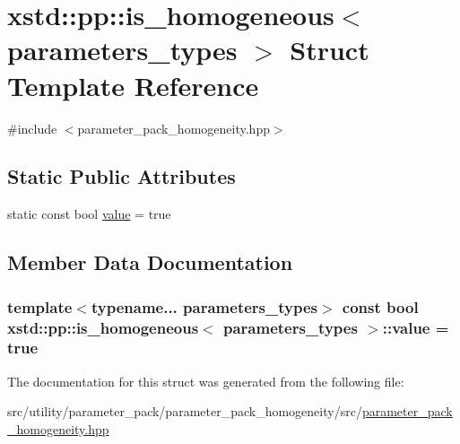 \hypertarget{structxstd_1_1pp_1_1is__homogeneous}{\section{xstd\-:\-:pp\-:\-:is\-\_\-homogeneous$<$ parameters\-\_\-types $>$ Struct Template Reference}
\label{structxstd_1_1pp_1_1is__homogeneous}
}


{\ttfamily \#include $<$parameter\-\_\-pack\-\_\-homogeneity.\-hpp$>$}

\subsection*{Static Public Attributes}
\begin{DoxyCompactItemize}
\item 
static const bool \hyperlink{structxstd_1_1pp_1_1is__homogeneous_a104d1888e8f39e2d57ab27c7c3fb7383}{value} = true
\end{DoxyCompactItemize}


\subsection{Member Data Documentation}
\hypertarget{structxstd_1_1pp_1_1is__homogeneous_a104d1888e8f39e2d57ab27c7c3fb7383}{
\subsubsection[{value}]{\setlength{\rightskip}{0pt plus 5cm}template$<$typename... parameters\-\_\-types$>$ const bool {\bf xstd\-::pp\-::is\-\_\-homogeneous}$<$ parameters\-\_\-types $>$\-::value = true\hspace{0.3cm}{\ttfamily [static]}}}\label{structxstd_1_1pp_1_1is__homogeneous_a104d1888e8f39e2d57ab27c7c3fb7383}


The documentation for this struct was generated from the following file\-:\begin{DoxyCompactItemize}
\item 
src/utility/parameter\-\_\-pack/parameter\-\_\-pack\-\_\-homogeneity/src/\hyperlink{parameter__pack__homogeneity_8hpp}{parameter\-\_\-pack\-\_\-homogeneity.\-hpp}\end{DoxyCompactItemize}
